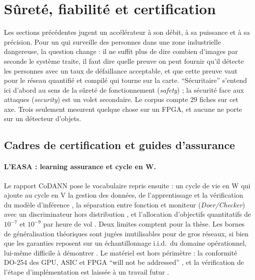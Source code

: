 \section{Sûreté, fiabilité et certification}
\label{sec:surete}

Les sections précédentes jugent un accélérateur à son débit, à sa puissance et à sa
précision. Pour un  qui surveille des personnes dans une zone industrielle dangereuse,
la question change : il ne suffit plus de dire combien d'images par seconde le système
traite, il faut dire quelle preuve on peut fournir qu'il détecte les personnes avec un taux
de défaillance acceptable, et que cette preuve vaut pour le réseau quantifié et compilé qui
tourne sur la carte. \enquote{Sécuritaire} s'entend ici d'abord au sens de la sûreté de
fonctionnement (\emph{safety}) ; la sécurité face aux attaques (\emph{security}) est un
volet secondaire. Le corpus compte 29 fiches sur cet axe. Trois seulement mesurent quelque
chose sur un FPGA, et aucune ne porte sur un détecteur d'objets.

\subsection{Cadres de certification et guides d'assurance}

\paragraph{L'EASA : learning assurance et cycle en W.} Le rapport CoDANN
\citep{2020-easa-concepts-design-assurance-neural-networks} pose le vocabulaire repris
ensuite : un cycle de vie en W qui ajoute au cycle en V la gestion des données, de
l'apprentissage et la vérification du modèle d'inférence , la séparation entre
fonction et moniteur (\emph{Doer/Checker}) avec un discriminateur hors distribution
, et l'allocation d'objectifs quantitatifs de $10^{-7}$ et $10^{-9}$ par heure de
vol . Deux limites comptent pour la thèse. Les bornes de
généralisation théoriques sont jugées inutilisables pour de gros réseaux, si bien que les
garanties reposent sur un échantillonnage i.i.d.\ du domaine opérationnel, lui-même
difficile à démontrer . Le matériel est hors périmètre : la conformité
DO-254 des GPU, ASIC et FPGA \enquote{will not be addressed} , et la
vérification de l'étape d'implémentation est laissée à un travail futur .

